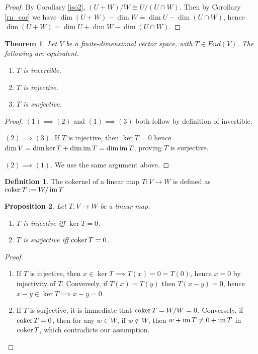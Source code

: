\documentclass[12pt]{article}
\theoremstyle{definition}
\newtheorem{definition}{Definition}[section]
\theoremstyle{plain}
\newtheorem{theorem}{Theorem}[section]
\newtheorem{proposition}[theorem] {Proposition}
\numberwithin{equation}{section}
\theoremstyle{definition}
\begin{document}
\begin{proof}
By Corollary \ref{iso2}, $ (U + W) / W \cong U / (U \cap W)$. Then by Corollary \ref{rn_cor} we have $ \dim (U + W) - \dim W = \dim U - \dim (U \cap W)$, hence $ \dim (U + W) = \dim U + \dim W - \dim (U \cap W) $.
\end{proof}

\begin{theorem}
Let $ V $ be a finite-dimensional vector space, with $ T \in End(V) $. The following are equivalent.
\begin{enumerate}
\item $ T $ is invertible.
\item $ T $ is injective.
\item $ T $ is surjective.
\end{enumerate}
\end{theorem}

\begin{proof}
$ (1) \implies (2) $ and $ (1) \implies (3) $ both follow by definition of invertible.

$ (2) \implies (3) $. If $ T $ is injective, then $ \ker T = 0 $ hence $ \dim V = \dim \ker T + \dim \operatorname{im} T = \dim \operatorname{im} T $, proving $ T $ is surjective.

$ (2) \implies (1) $. We use the same argument above.
\end{proof}


\begin{definition}
The cokernel of a linear map $ T : V \to W $ is defined as $ \operatorname{coker} T := W / \operatorname{im} T $
\end{definition}

\begin{proposition}
Let $ T : V \to W $ be a linear map.
\begin{enumerate}
\item $ T $ is injective iff $ \ker T = 0 $.
\item $ T $ is surjective iff $ \operatorname{coker} T = 0 $.
\end{enumerate}
\end{proposition}

\begin{proof}
\begin{enumerate}
\item If $ T $ is injective, then $ x \in \ker T \implies T(x) = 0 = T(0) $, hence $ x = 0 $ by injectivity of $ T $. Conversely, if $ T(x) = T(y) $ then $ T(x - y) = 0 $, hence $ x - y \in \ker T \implies x - y = 0$.

\item If $ T $ is surjective, it is immediate that $ \operatorname{coker} T = W / W = 0 $. Conversely, if $ \operatorname{coker} T = 0 $, then for any $ w \in W $, if $ w \notin W $, then $ w + \operatorname{im} T \neq 0 + \operatorname{im} T $ in $ \operatorname{coker} T $, which contradicts our assumption.
\end{enumerate}
\end{proof}
\end{document}
